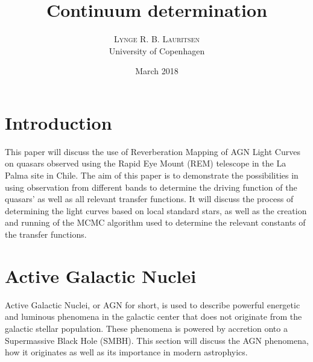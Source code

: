 \documentclass[11pt]{article}
\title{\vspace{-20mm}\fontsize{16pt}{10pt}\selectfont\textbf{Continuum determination}} %
\author{
\textsc{Lynge R. B. Lauritsen} \\
\normalsize University of Copenhagen \\ %
\date{March 2018}
\vspace{-9mm}
}
\begin{document}
\maketitle %







\section{Introduction}
This paper will discuss the use of Reverberation Mapping of AGN Light Curves on quasars observed using the Rapid Eye Mount (REM) telescope in the La Palma site in Chile. The aim of this paper is to demonstrate the possibilities in using observation from different bands to determine the driving function of the quasars' as well as all relevant transfer functions. It will discuss the process of determining the light curves based on local standard stars, as well as the creation and running of the MCMC algorithm used to determine the relevant constants of the transfer functions.

\section{Active Galactic Nuclei}
Active Galactic Nuclei, or AGN for short, is used to describe powerful energetic and luminous phenomena in the galactic center that does not originate from the galactic stellar population. These phenomena is powered by accretion onto a Supermassive Black Hole (SMBH). This section will discuss the AGN phenomena, how it originates as well as its importance in modern astrophyics.
\end{document}
